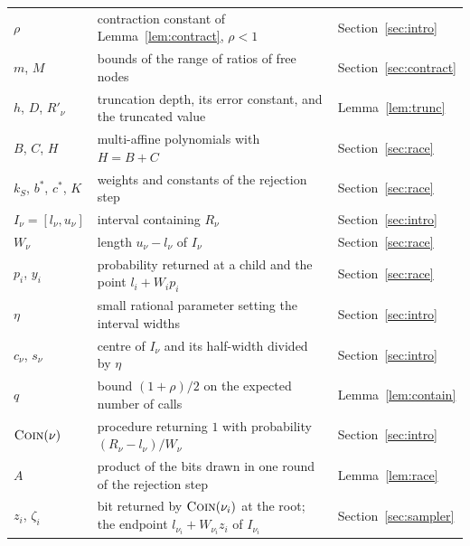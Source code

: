 \documentclass[11pt]{amsart}
\newcommand{\nsc}[1]{\textnormal{\textsc{#1}}}
\begin{document}
\begin{center}
\begin{tabular}{@{}lp{}l@{}}
$\rho$ & contraction constant of Lemma~\ref{lem:contract}, $\rho<1$ & Section~\ref{sec:intro}\\
$m$, $M$ & bounds of the range of ratios of free nodes & Section~\ref{sec:contract}\\
$h$, $D$, $R'_\nu$ & truncation depth, its error constant, and the truncated value & Lemma~\ref{lem:trunc}\\
$B$, $C$, $H$ & multi-affine polynomials with $H=B+C$ & Section~\ref{sec:race}\\
$k_S$, $b^*$, $c^*$, $K$ & weights and constants of the rejection step & Section~\ref{sec:race}\\
$I_\nu=[l_\nu,u_\nu]$ & interval containing $R_\nu$ & Section~\ref{sec:intro}\\
$W_\nu$ & length $u_\nu-l_\nu$ of $I_\nu$ & Section~\ref{sec:race}\\
$p_i$, $y_i$ & probability returned at a child and the point $l_i+W_ip_i$ & Section~\ref{sec:race}\\
$\eta$ & small rational parameter setting the interval widths & Section~\ref{sec:intro}\\
$c_\nu$, $s_\nu$ & centre of $I_\nu$ and its half-width divided by $\eta$ & Section~\ref{sec:intro}\\
$q$ & bound $(1+\rho)/2$ on the expected number of calls & Lemma~\ref{lem:contain}\\
$\nsc{Coin}(\nu)$ & procedure returning $1$ with probability $(R_\nu-l_\nu)/W_\nu$ & Section~\ref{sec:intro}\\
$A$ & product of the bits drawn in one round of the rejection step & Lemma~\ref{lem:race}\\
$z_i$, $\zeta_i$ & bit returned by $\nsc{Coin}(\nu_i)$ at the root; the endpoint $l_{\nu_i}+W_{\nu_i}z_i$ of $I_{\nu_i}$ & Section~\ref{sec:sampler}\\
\bottomrule
\end{tabular}
\end{center}
\end{document}
